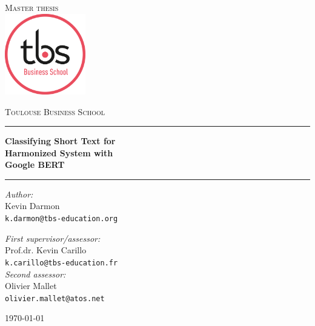 \documentclass[11pt,a4paper]{report}
\begin{document}
\begin{titlepage}
\begin{center}
\textsc{\LARGE Master thesis}\\[1.5cm]
\includegraphics[height=100pt]{tbs_logo_2019.png}

\vspace{0.4cm}
\textsc{\Large Toulouse Business School}\\[1cm]
\hrule
\vspace{0.4cm}
\textbf{\huge Classifying Short Text for \\Harmonized System with \\Google BERT\\[0.3cm]
\LARGE }
\hrule
\vspace{2cm}
\begin{minipage}[t]{0.52\textwidth}
\begin{flushleft} \large
\textit{Author:}\\
Kevin Darmon\\
\texttt{k.darmon@tbs-education.org}\\[1.3cm]
\end{flushleft}
\end{minipage}
\begin{minipage}[t]{0.45\textwidth}
\begin{flushright} \large
\textit{First supervisor/assessor:}\\
Prof.dr. Kevin Carillo\\
\texttt{k.carillo@tbs-education.fr}\\[1.3cm]
\textit{Second assessor:}\\
Olivier Mallet\\
\texttt{olivier.mallet@atos.net}
\end{flushright}
\end{minipage}
\vfill
{\large \today}
\end{center}
\end{titlepage}



\tableofcontents







\appendix

\end{document}
